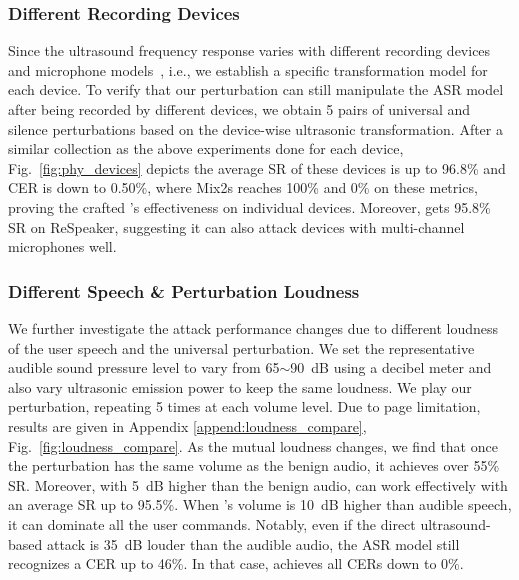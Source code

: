 \subsubsection{Different Recording Devices}
Since the ultrasound frequency response varies with different recording devices and microphone models~\cite{li2023learning}, i.e., we establish a specific transformation model for each device.
To verify that our perturbation can still manipulate the ASR model after being recorded by different devices, we obtain 5 pairs of universal and silence perturbations based on the device-wise ultrasonic transformation. 
After a similar collection as the above experiments done for each device, Fig.~\ref{fig:phy_devices} depicts the average SR of these devices is up to 96.8\% and CER is down to 0.50\%, where Mix2s reaches 100\% and 0\% on these metrics, proving the crafted \alias's effectiveness on individual devices. Moreover, \alias gets 95.8\% SR on ReSpeaker, suggesting it can also attack devices with multi-channel microphones well.

\subsubsection{Different Speech \& Perturbation Loudness}
We further investigate the attack performance changes due to different loudness of the user speech and the universal perturbation. 
We set the representative audible sound pressure level to vary from 65$\sim$90~dB using a decibel meter and also vary ultrasonic emission power to keep the same loudness.
We play our perturbation, repeating 5 times at each volume level. Due to page limitation, results are given in Appendix \textsection\ref{append:loudness_compare}, Fig.~\ref{fig:loudness_compare}. As the mutual loudness changes, we find that once the perturbation has the same volume as the benign audio, it achieves over 55\% SR.
Moreover, with 5~dB higher than the benign audio, \alias can work effectively with an average SR up to 95.5\%. When \alias's volume is 10~dB higher than audible speech, it can dominate all the user commands. Notably, even if the direct ultrasound-based attack is 35~dB louder than the audible audio, the ASR model still recognizes a CER up to 46\%. In that case, \alias achieves all CERs down to 0\%.

